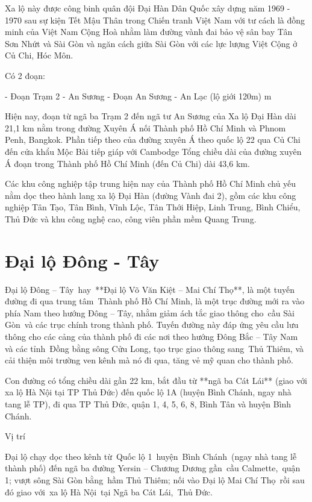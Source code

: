 Xa lộ này được công binh quân đội Đại Hàn Dân Quốc xây dựng năm 1969 - 1970 sau sự kiện Tết Mậu Thân trong Chiến tranh Việt Nam với tư cách là đồng minh của Việt Nam Cộng Hoà nhằm làm đường vành đai bảo vệ sân bay Tân Sơn Nhứt và Sài Gòn và ngăn cách giữa Sài Gòn với các lực lượng Việt Cộng ở Củ Chi, Hóc Môn.

Có 2 đoạn:

- Đoạn Trạm 2 - An Sương
- Đoạn An Sương - An Lạc (lộ giới 120m) m

Hiện nay, đoạn từ ngã ba Trạm 2 đến ngã tư An Sương của Xa lộ Đại Hàn dài 21,1 km nằm trong đường Xuyên Á nối Thành phố Hồ Chí Minh và Phnom Penh, Bangkok. Phần tiếp theo của đường xuyên Á theo quốc lộ 22 qua Củ Chi đến cửa khẩu Mộc Bài tiếp giáp với Cambodge Tổng chiều dài của đường xuyên Á đoạn trong Thành phố Hồ Chí Minh (đến Củ Chi) dài 43,6 km.

Các khu công nghiệp tập trung hiện nay của Thành phố Hồ Chí Minh chủ yếu nằm dọc theo hành lang xa lộ Đại Hàn (đường Vành đai 2), gồm các khu công nghiệp Tân Tạo, Tân Bình, Vĩnh Lộc, Tân Thới Hiệp, Linh Trung, Bình Chiểu, Thủ Đức và khu công nghệ cao, công viên phần mềm Quang Trung.

\section{Đại lộ Đông - Tây}

Đại lộ Đông – Tây hay **Đại lộ Võ Văn Kiệt – Mai Chí Thọ**, là một tuyến đường đi qua trung tâm Thành phố Hồ Chí Minh, là một trục đường mới ra vào phía Nam theo hướng Đông – Tây, nhằm giảm ách tắc giao thông cho cầu Sài Gòn và các trục chính trong thành phố. Tuyến đường này đáp ứng yêu cầu lưu thông cho các cảng của thành phố đi các nơi theo hướng Đông Bắc – Tây Nam và các tỉnh Đồng bằng sông Cửu Long, tạo trục giao thông sang Thủ Thiêm, và cải thiện môi trường ven kênh mà nó đi qua, tăng vẻ mỹ quan cho thành phố.

Con đường có tổng chiều dài gần 22 km, bắt đầu từ **ngã ba Cát Lái** (giao với xa lộ Hà Nội tại TP Thủ Đức) đến quốc lộ 1A (huyện Bình Chánh, ngay nhà tang lễ TP), đi qua TP Thủ Đức, quận 1, 4, 5, 6, 8, Bình Tân và huyện Bình Chánh.

Vị trí

Đại lộ chạy dọc theo kênh từ Quốc lộ 1 huyện Bình Chánh (ngay nhà tang lễ thành phố) đến ngã ba đường Yersin – Chương Dương gần cầu Calmette, quận 1; vượt sông Sài Gòn bằng hầm Thủ Thiêm; nối vào Đại lộ Mai Chí Thọ rồi sau đó giao với xa lộ Hà Nội tại Ngã ba Cát Lái, Thủ Đức.

